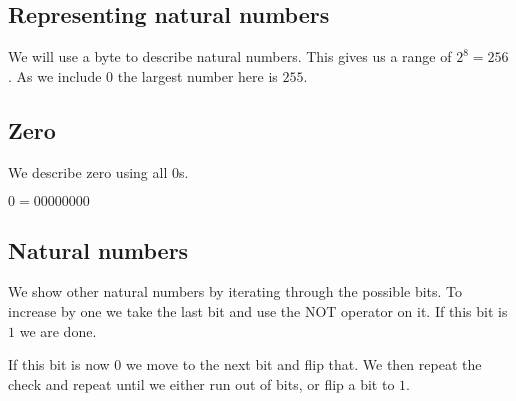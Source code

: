 
\subsection{Representing natural numbers}

We will use a byte to describe natural numbers. This gives us a range of \(2^8=256\). As we include \(0\) the largest number here is \(255\).

\subsection{Zero}

We describe zero using all \(0\)s.

\(0=00000000\)

\subsection{Natural numbers}

We show other natural numbers by iterating through the possible bits. To increase by one we take the last bit and use the NOT operator on it. If this bit is \(1\) we are done.

If this bit is now \(0\) we move to the next bit and flip that. We then repeat the check and repeat until we either run out of bits, or flip a bit to \(1\).

